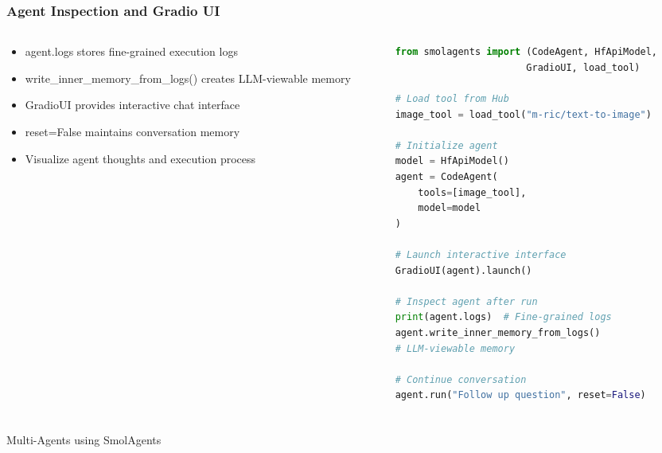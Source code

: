 \begin{frame}[fragile]\frametitle{Agent Inspection and Gradio UI}
\begin{columns}
\begin{column}{0.5\textwidth}
      \begin{itemize}
	\item agent.logs stores fine-grained execution logs
	\item write\_inner\_memory\_from\_logs() creates LLM-viewable memory
	\item GradioUI provides interactive chat interface
	\item reset=False maintains conversation memory
	\item Visualize agent thoughts and execution process
	  \end{itemize}
\end{column}
\begin{column}{0.5\textwidth}
\begin{lstlisting}[language=Python, basicstyle=\tiny]
from smolagents import (CodeAgent, HfApiModel, 
                       GradioUI, load_tool)

# Load tool from Hub
image_tool = load_tool("m-ric/text-to-image")

# Initialize agent
model = HfApiModel()
agent = CodeAgent(
    tools=[image_tool], 
    model=model
)

# Launch interactive interface
GradioUI(agent).launch()

# Inspect agent after run
print(agent.logs)  # Fine-grained logs
agent.write_inner_memory_from_logs()  
# LLM-viewable memory

# Continue conversation
agent.run("Follow up question", reset=False)
\end{lstlisting}
\end{column}
\end{columns}
\end{frame}

\begin{frame}[fragile]\frametitle{}
\begin{center}
{\Large Multi-Agents using SmolAgents}
\end{center}
\end{frame}

